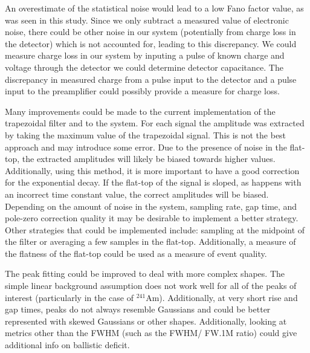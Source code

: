 An overestimate of the statistical noise would lead to a low Fano factor value, as was seen in this study. Since we only subtract a measured value of electronic noise, there could be other noise in our system (potentially from charge loss in the detector) which is not accounted for, leading to this discrepancy. We could measure charge loss in our system by inputing a pulse of known charge and voltage through the detector we could determine detector capacitance. The discrepancy in measured charge from a pulse input to the detector and a pulse input to the preamplifier could possibly provide a measure for charge loss.

Many improvements could be made to the current implementation of the trapezoidal filter and to the system. For each signal the amplitude was extracted by taking the maximum value of the trapezoidal signal. This is not the best approach and may introduce some error. Due to the presence of noise in the flat-top, the extracted amplitudes will likely be biased towards higher values. Additionally, using this method, it is more important to have a good correction for the exponential decay. If the flat-top of the signal is sloped, as happens with an incorrect time constant value, the correct amplitudes will be biased. Depending on the amount of noise in the system, sampling rate, gap time, and pole-zero correction quality it may be desirable to implement a better strategy. Other strategies that could be implemented include: sampling at the midpoint of the filter or averaging a few samples in the flat-top. Additionally, a measure of the flatness of the flat-top could be used as a measure of event quality.

The peak fitting could be improved to deal with more complex shapes. The simple linear background assumption does not work well for all of the peaks of interest (particularly in the case of  ${}^{241}$Am). Additionally, at very short rise and gap times, peaks do not always resemble Gaussians and could be better represented with skewed Gaussians or other shapes. Additionally, looking at metrics other than the FWHM (such as the FWHM/ FW.1M ratio) could give additional info on ballistic deficit.
